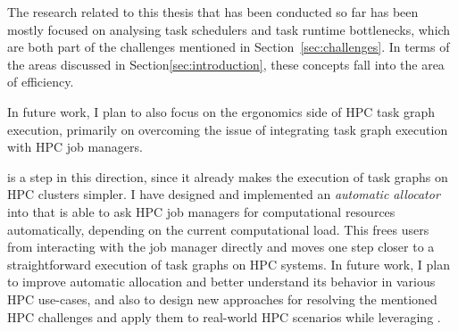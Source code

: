The research related to this thesis that has been conducted so far has been mostly focused on
analysing task schedulers and task runtime bottlenecks, which are both part of the
challenges mentioned in Section~\ref{sec:challenges}. In terms of the areas discussed in
Section\ref{sec:introduction}, these concepts fall into the area of efficiency.

In future work, I plan to also focus on the ergonomics side of HPC task graph execution,
primarily on overcoming the issue of integrating task graph execution with HPC job managers.

\hyperqueue{} is a step in this direction, since it already makes the execution
of task graphs on HPC clusters simpler. I have designed and implemented an \emph{automatic allocator}
into \hyperqueue{} that is able to ask HPC job managers for computational resources automatically,
depending on the current computational load. This frees users from interacting with the job manager
directly and moves one step closer to a straightforward execution of task graphs on HPC systems.
In future work, I plan to improve automatic allocation and better understand its behavior in
various HPC use-cases, and also to design new approaches for resolving the mentioned HPC challenges
and apply them to real-world HPC scenarios while leveraging \hyperqueue{}.
